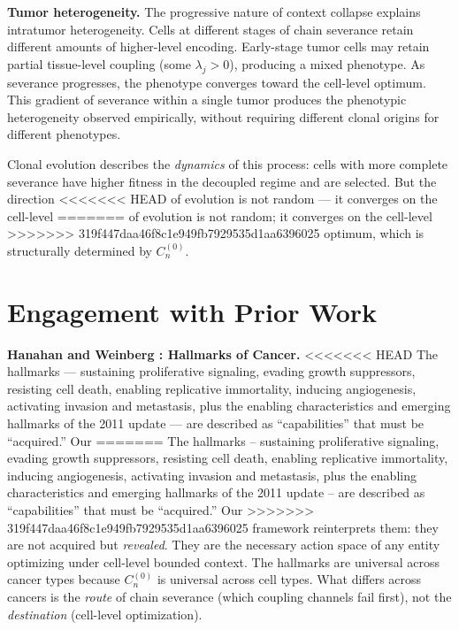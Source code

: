 \documentclass[11pt]{article}
\theoremstyle{definition}
\theoremstyle{remark}
\begin{document}
\textbf{Tumor heterogeneity.} The progressive nature of context
collapse explains intratumor heterogeneity. Cells at different
stages of chain severance retain different amounts of higher-level
encoding. Early-stage tumor cells may retain partial tissue-level
coupling (some $\lambda_j > 0$), producing a mixed phenotype. As
severance progresses, the phenotype converges toward the cell-level
optimum. This gradient of severance within a single tumor produces
the phenotypic heterogeneity observed empirically, without requiring
different clonal origins for different phenotypes.

Clonal evolution \cite{Nowell1976} describes the \emph{dynamics}
of this process: cells with more complete severance have higher
fitness in the decoupled regime and are selected. But the direction
<<<<<<< HEAD
of evolution is not random --- it converges on the cell-level
=======
of evolution is not random; it converges on the cell-level
>>>>>>> 319f447daa46f8c1e949fb7929535d1aa6396025
optimum, which is structurally determined by $C_n^{(0)}$.

\section{Engagement with Prior Work}
\label{sec:prior}

\textbf{Hanahan and Weinberg \cite{Hanahan2000, Hanahan2011}:
Hallmarks of Cancer.}
<<<<<<< HEAD
The hallmarks --- sustaining proliferative signaling, evading growth
suppressors, resisting cell death, enabling replicative immortality,
inducing angiogenesis, activating invasion and metastasis, plus the
enabling characteristics and emerging hallmarks of the 2011 update
--- are described as ``capabilities'' that must be ``acquired.'' Our
=======
The hallmarks -- sustaining proliferative signaling, evading growth
suppressors, resisting cell death, enabling replicative immortality,
inducing angiogenesis, activating invasion and metastasis, plus the
enabling characteristics and emerging hallmarks of the 2011 update
-- are described as ``capabilities'' that must be ``acquired.'' Our
>>>>>>> 319f447daa46f8c1e949fb7929535d1aa6396025
framework reinterprets them: they are not acquired but
\emph{revealed}. They are the necessary action space of any entity
optimizing under cell-level bounded context. The hallmarks are
universal across cancer types because $C_n^{(0)}$ is universal
across cell types. What differs across cancers is the \emph{route}
of chain severance (which coupling channels fail first), not the
\emph{destination} (cell-level optimization).
\end{document}
